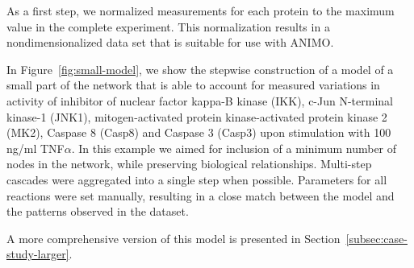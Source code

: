 As a first step, we normalized measurements for each protein to the
maximum value in the complete experiment. This normalization results in a nondimensionalized data set that 
is suitable for use with ANIMO.


In Figure~\ref{fig:small-model}, we show the stepwise construction of a model of a small part of the network that is
able to account for measured variations in activity of inhibitor of nuclear factor kappa-B kinase (IKK), c-Jun N-terminal kinase-1 (JNK1),
mitogen-activated protein kinase-activated protein kinase 2 (MK2), Caspase 8 (Casp8) and Caspase 3 (Casp3) upon stimulation with 100
ng/ml TNF$\alpha$. In this example we aimed for inclusion of a minimum number of nodes in the network, while preserving biological relationships.
Multi-step cascades were aggregated into a single step when possible. Parameters for all reactions were set manually, resulting in a close
match between the model and the patterns observed in the dataset.

A more comprehensive version of this model is presented in Section~\ref{subsec:case-study-larger}.

